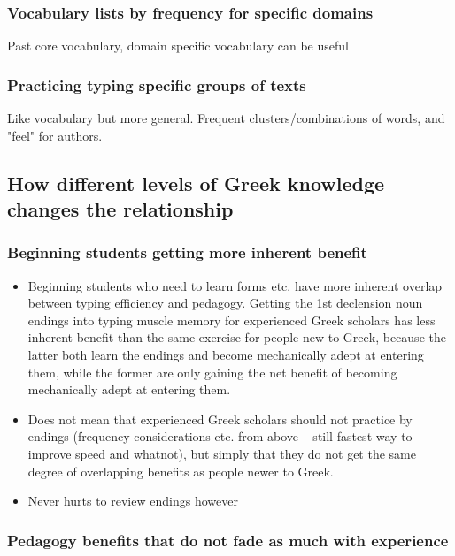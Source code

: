 \documentclass[11pt]{article}
\begin{document}
\subsubsection{Vocabulary lists by frequency for specific domains}
\label{sec:org38cc6de}

Past core vocabulary, domain specific vocabulary can be useful

\subsubsection{Practicing typing specific groups of texts}
\label{sec:org106fe3c}

Like vocabulary but more general. Frequent clusters/combinations of words, and "feel" for authors.

\subsection{How different levels of Greek knowledge changes the relationship}
\label{sec:org971e89a}

\subsubsection{Beginning students getting more inherent benefit}
\label{sec:org9daf7ee}

\begin{itemize}
\item Beginning students who need to learn forms etc. have more inherent overlap between typing efficiency and pedagogy. Getting the 1st declension noun endings into typing muscle memory for experienced Greek scholars has less inherent benefit than the same exercise for people new to Greek, because the latter both learn the endings and become mechanically adept at entering them, while the former are only gaining the net benefit of becoming mechanically adept at entering them.
\item Does not mean that experienced Greek scholars should not practice by endings (frequency considerations etc. from above -- still fastest way to improve speed and whatnot), but simply that they do not get the same degree of overlapping benefits as people newer to Greek.
\item Never hurts to review endings however
\end{itemize}

\subsubsection{Pedagogy benefits that do not fade as much with experience}
\label{sec:orga538820}
\end{document}
